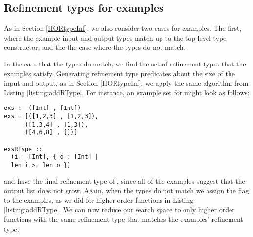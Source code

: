 \subsection{Refinement types for examples}
As in Section \ref{HORtypeInf}, we also consider two cases for examples. The first, where the example input and output types match up to the top level type constructor, and the the case where the types do not match.

In the case that the types do match, we find the set of refinement types that the examples satisfy. Generating refinement type predicates about the size of the input and output, as in Section \ref{HORtypeInf}, we apply the same algorithm from Listing \ref{listing:addRType}. 
For instance, an example set for  might look as follows:

\begin{lstlisting}[caption=Refinement type inference for examples,label=exRTypeGen]
exs :: ([Int] , [Int])
exs = [([1,2,3] , [1,2,3]),
      ([1,3,4] , [1,3]),
      ([4,6,8] , [])]
       
exsRType ::
  (i : [Int], { o : [Int] |
  len i >= len o })
\end{lstlisting}

\noindent and have the final refinement type of , since all of the examples suggest that the output list does not grow. 
Again, when the types do not match we assign the  flag to the examples, as we did for higher order functions in Listing \ref{listing:addRType}.
We can now reduce our search space to only higher order functions with the same refinement type that matches the examples' refinement type. 
